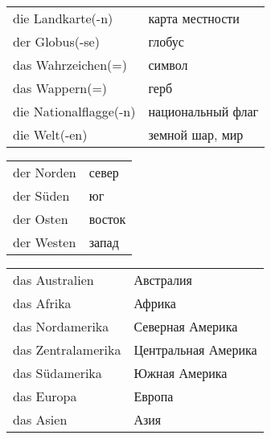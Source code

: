 
\begin{tabular}{|l|l|}
\hline
die Landkarte(-n) & карта местности \\
der Globus(-se) & глобус \\
das Wahrzeichen(=) & символ \\
das Wappern(=) & герб \\
die Nationalflagge(-n) & национальный флаг \\
die Welt(-en) & земной шар, мир \\
\hline
\end{tabular}



\begin{tabular}{|l|l|}
\hline
der Norden & север \\
der S\"uden & юг \\
der Osten & восток \\
der Westen & запад \\
\hline
\end{tabular}


\begin{tabular}{|l|l|}
\hline
das Australien & Австралия \\
das Afrika & Африка \\
das Nordamerika & Северная Америка \\
das Zentralamerika & Центральная Америка \\
das S\"udamerika & Южная Америка \\
das Europa & Европа \\
das Asien & Азия \\
\hline 
\end{tabular}

